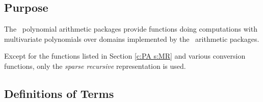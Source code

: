\subsection{Purpose}
\label{c:PA s:I ss:P}

The \saclib\ polynomial arithmetic packages provide functions doing
computations with multivariate polynomials over domains implemented by the
\saclib\ arithmetic packages.

Except for the functions listed in Section \ref{c:PA s:MR} and various
conversion functions, only the {\em sparse recursive} representation is
used.


\subsection{Definitions of Terms}
\label{c:PA s:I ss:D}

